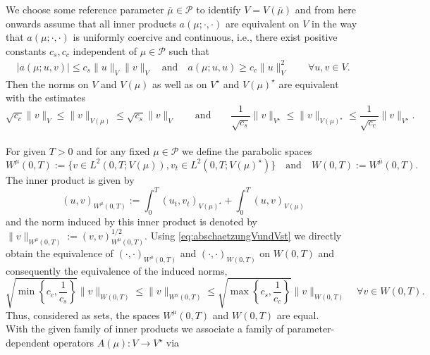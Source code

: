 \documentclass{article}
\theoremstyle{plain}
\theoremstyle{definition}
\theoremstyle{remark}
\begin{document}
We choose some reference parameter $\overline{\mu} \in \mathcal{P}$ to identify $V = V(\overline{\mu})$ and from here onwards assume that all inner products $a(\mu; \cdot, \cdot)$ are equivalent on $V$ in the way that $a(\mu; \cdot, \cdot)$ is uniformly coercive and continuous, i.e., there exist positive constants $c_s, c_c$ independent of $\mu \in \mathcal P$ such that
\begin{align} \label{eq:rbcoercivitycontconst}
\vert a(\mu;u,v)\vert \le c_s \|u\|_V\|v\|_V \quad \text{and} \quad a(\mu;u,u) \ge c_c \|u\|_V^2 \qquad \forall u,v\in V.    
\end{align}
Then the norms on $V$ and $V(\mu)$ as well as on $V^{\star}$ and $V(\mu)^{\star}$ are equivalent with the estimates
\begin{equation}\label{eq:abschaetzungVundVst}
 \sqrt{c_c}\|v\|_V \le \|v\|_{V(\mu)} \le \sqrt{c_s}\|v\|_V \qquad \text{and} \qquad \frac{1}{\sqrt{c_s}}\|v\|_{V^{\star}} \le \|v\|_{V(\mu)^{\star}} \le \frac{1}{\sqrt{c_c}}\|v\|_{V^{\star}}.
\end{equation}
\\
For given $T > 0$ and for any fixed $\mu \in \mathcal{P}$ we define the parabolic spaces
\begin{equation}
    W^{\mu}(0, T) := \{v\in L^2(0,T;V(\mu)), v_t\in L^2(0,T;V(\mu)^\star)\} \quad \text{and} \quad W(0,T) := W^{\overline{\mu}}(0, T).
\end{equation}
The inner product is given by 
\begin{equation}
    (u,v)_{W^{\mu}(0,T)} := \int_0^T (u_t,v_t)_{V(\mu)^\star} + \int_0^T(u,v)_{V(\mu)}
\end{equation}
and the norm induced by this inner product is denoted by $\|v\|_{W^{\mu}(0,T)} := (v,v)_{W^{\mu}(0,T)}^{1/2}$.
Using \eqref{eq:abschaetzungVundVst} we directly obtain the equivalence of $(\cdot, \cdot)_{W^{\mu}(0,T)}$ and $(\cdot, \cdot)_{W(0,T)}$ on $W(0,T)$ and consequently the equivalence of the induced norms,
\begin{equation} \label{eq:normsWequi}
    \sqrt{\min\left\lbrace c_c,\frac{1}{c_s}\right\rbrace }\|v\|_{W(0,T)} \le \|v\|_{W^{\mu}(0,T)} \le \sqrt{\max\left\lbrace c_s,\frac{1}{c_c} \right\rbrace }\|v\|_{W(0,T)} \quad \forall v\in W(0,T).
\end{equation}
Thus, considered as sets, the spaces $W^{\mu}(0,T)$ and $W(0,T)$ are equal.\\ 
With the given family of inner products we associate a family of parameter-dependent operators $A(\mu) : V \rightarrow V^{\star}$ via 
\end{document}
